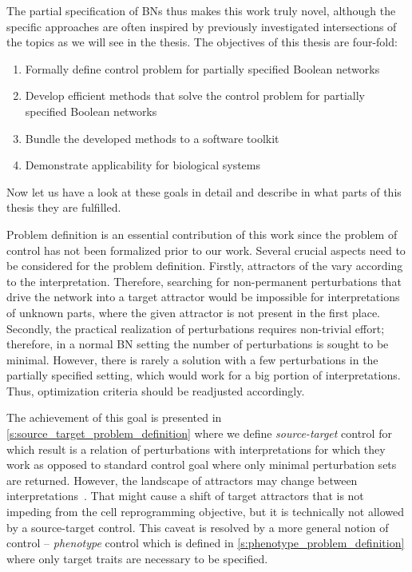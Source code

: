 The partial specification of BNs thus makes this work truly novel, although the specific approaches are often inspired by previously investigated intersections of the topics as we will see in the thesis. The objectives of this thesis are four-fold:

\begin{enumerate}
    \item Formally define control problem for partially specified Boolean networks
    \item Develop efficient methods that solve the control problem for partially specified Boolean networks 
    \item Bundle the developed methods to a software toolkit
    \item Demonstrate applicability for biological systems
\end{enumerate}

Now let us have a look at these goals in detail and describe in what parts of this thesis they are fulfilled.

\medskip

\noindent{}\hspace{3pt} Problem definition is an essential contribution of this work since the problem of \PBN{} control has not been formalized prior to our work. Several crucial aspects need to be considered for the problem definition. Firstly, attractors of the \PBN{} vary according to the interpretation. Therefore, searching for non-permanent perturbations that drive the network into a target attractor would be impossible for interpretations of unknown parts, where the given attractor is not present in the first place. Secondly, the practical realization of perturbations requires non-trivial effort; therefore, in a normal BN setting the number of perturbations is sought to be minimal. However, there is rarely a solution with a few perturbations in the partially specified setting, which would work for a big portion of interpretations. Thus, optimization criteria should be readjusted accordingly. 

The achievement of this goal is presented in \autoref{s:source_target_problem_definition} where we define \emph{source-target} control for \PBN{} which result is a relation of perturbations with interpretations for which they work as opposed to standard control goal where only minimal perturbation sets are returned. However, the landscape of attractors may change between interpretations~\cite{Benes2022}. That might cause a shift of target attractors that is not impeding from the cell reprogramming objective, but it is technically not allowed by a source-target control. This caveat is resolved by a more general notion of control -- \emph{phenotype} control which is defined in \autoref{s:phenotype_problem_definition} where only target traits are necessary to be specified.

